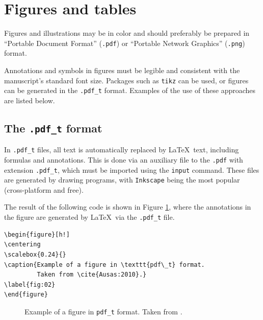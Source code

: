 \documentclass[english]{TCAM} %
\begin{document}


\setcounter{section}{3}

\section{Figures and tables}

Figures and illustrations may be in color and should preferably be prepared in ``Portable Document Format'' (\texttt{.pdf}) or ``Portable Network Graphics'' (\texttt{.png}) format.

Annotations and symbols in figures must be legible and consistent with the manuscript's standard font size. Packages such as \texttt{tikz} can be used, or figures can be generated in the \texttt{.pdf\_t} format. Examples of the use of these approaches are listed below.

\subsection{The \texttt{.pdf\_t} format}

In \texttt{.pdf\_t} files, all text is automatically replaced by \LaTeX\ text, including formulas and annotations. This is done via an auxiliary file to the \texttt{.pdf} with extension \texttt{.pdf\_t}, which must be imported using the \texttt{input} command.
These files are generated by drawing programs, with \texttt{Inkscape} being the most popular (cross-platform and free).

The result of the following code is shown in Figure \ref{fig:02}, where the annotations in the figure are generated by \LaTeX\ via the \texttt{.pdf\_t} file.

\begin{framed}
\begin{verbatim}
\begin{figure}[h!]
\centering
\scalebox{0.24}{}
\caption{Example of a figure in \texttt{pdf\_t} format. 
         Taken from \cite{Ausas:2010}.}
\label{fig:02}
\end{figure}
\end{verbatim}
\end{framed}

\begin{figure}[h!]
\centering
\scalebox{0.24}{}
\caption{Example of a figure in \texttt{pdf\_t} format. Taken from \cite{Ausas:2010}.}
\label{fig:02}
\end{figure}
\end{document}
